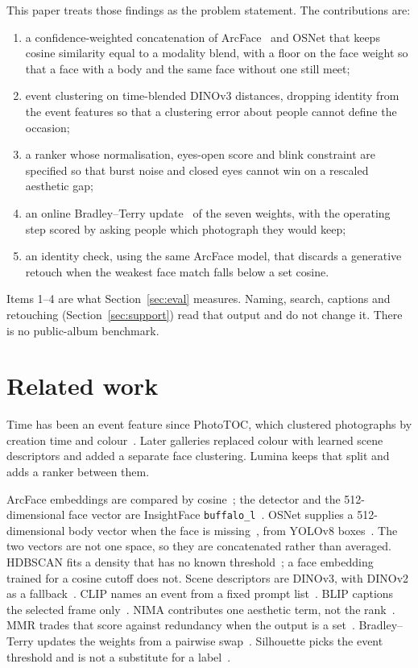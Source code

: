 \documentclass[conference]{IEEEtran}
\begin{document}
This paper treats those findings as the problem statement. The contributions
are:
\begin{enumerate}
\item a confidence-weighted concatenation of ArcFace~\cite{deng2019arcface}
and OSNet that keeps cosine similarity equal to a modality blend, with a floor
on the face weight so that a face with a body and the same face without one
still meet;
\item event clustering on time-blended \mbox{DINOv3} distances, dropping identity
from the event features so that a clustering error about people cannot define
the occasion;
\item a ranker whose normalisation, eyes-open score and blink constraint are
specified so that burst noise and closed eyes cannot win on a rescaled
aesthetic gap;
\item an online Bradley--Terry update~\cite{bradley1952rank} of the seven
weights, with the operating step scored by asking people which photograph they
would keep;
\item an identity check, using the same ArcFace model, that discards a
generative retouch when the weakest face match falls below a set cosine.
\end{enumerate}
Items 1--4 are what Section~\ref{sec:eval} measures. Naming, search, captions
and retouching (Section~\ref{sec:support}) read that output and do not change
it. There is no public-album benchmark.

\section{Related work}
\label{sec:related}

Time has been an event feature since PhotoTOC, which clustered photographs by
creation time and colour~\cite{platt2003phototoc}. Later galleries replaced
colour with learned scene descriptors and added a separate face
clustering. Lumina keeps that split and adds a ranker between them.

ArcFace embeddings are compared by cosine~\cite{deng2019arcface}; the detector
and the 512-dimensional face vector are InsightFace
\texttt{buffalo\_l}~\cite{insightface}. OSNet supplies a 512-dimensional body
vector when the face is missing~\cite{zhou2019osnet}, from YOLOv8
boxes~\cite{jocher2023yolov8}. The two vectors are not one space, so they are
concatenated rather than averaged. HDBSCAN fits a density that has no known
threshold~\cite{mcinnes2017hdbscan}; a face embedding trained for a cosine
cutoff does not. Scene descriptors are \mbox{DINOv3}, with DINOv2 as a
fallback~\cite{oquab2024dinov2,simeoni2025dinov3}. CLIP names an event from a
fixed prompt list~\cite{radford2021clip}. BLIP captions the selected frame
only~\cite{li2022blip}. NIMA contributes one aesthetic term, not the
rank~\cite{talebi2018nima,murray2012ava}. MMR trades that score against
redundancy when the output is a set~\cite{carbonell1998mmr}. Bradley--Terry
updates the weights from a pairwise swap~\cite{bradley1952rank}. Silhouette
picks the event threshold and is not a substitute for a
label~\cite{rousseeuw1987silhouettes}.
\end{document}
